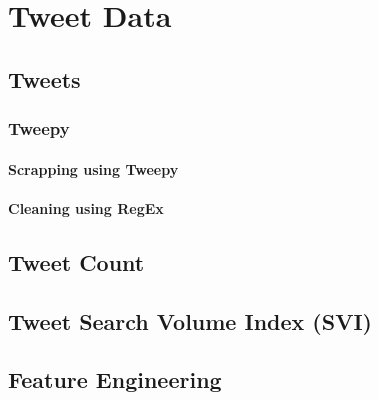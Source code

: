 \chapter{Tweet Data}

\section{Tweets}

\subsection{Tweepy}



\subsubsection{Scrapping using Tweepy}



\subsubsection{Cleaning using RegEx}



\section{Tweet Count}




\section{Tweet Search Volume Index (SVI)}


\section{Feature Engineering}
